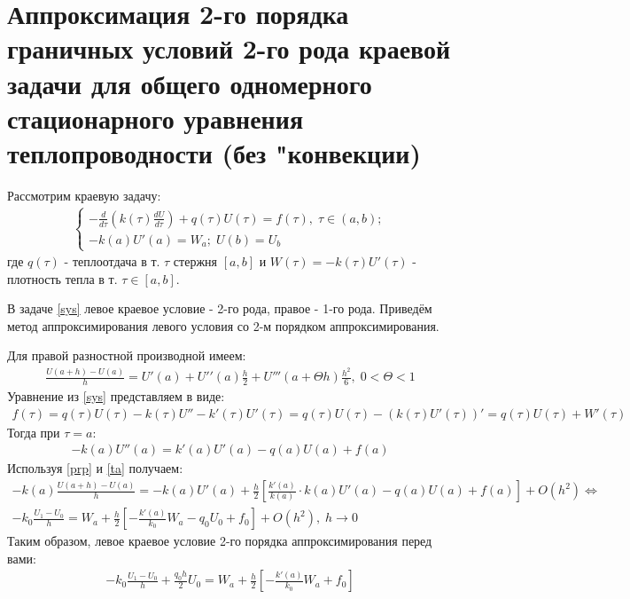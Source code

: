 \documentclass[__main__.tex]{subfiles}
\begin{document}
\section{Аппроксимация 2-го порядка граничных условий 2-го рода краевой задачи для общего одномерного стационарного уравнения теплопроводности (без "конвекции)}

Рассмотрим краевую задачу:
\begin{gather}
	\begin{cases}
	-\frac{d}{d\tau}\left(k(\tau)\frac{dU}{d\tau}\right)+
	q(\tau)U(\tau)=f(\tau),\; \tau\in(a,b);\\
	-k(a)U\prime(a)=W_a;\; U(b)=U_b
	\end{cases}
	\label{sys}
\end{gather}
где $q(\tau)$ - теплоотдача в т. $\tau$ стержня $[a,b]$ и $W(\tau)=-k(\tau)U\prime(\tau)$ - плотность тепла в т. $\tau\in[a,b].$

В задаче \ref{sys} левое краевое условие - 2-го рода, правое - 1-го рода. Приведём метод аппроксимирования левого условия со 2-м порядком аппроксимирования.

Для правой разностной производной имеем:
\begin{gather}
	\frac{U(a+h)-U(a)}{h}=U\prime(a)+U\prime\prime(a)\frac{h}{2}+U'''(a+\Theta h)\frac{h^2}{6},\; 0<\Theta<1
	\label{prp}
\end{gather}
Уравнение из \ref{sys} представляем в виде:
\begin{gather*}
	f(\tau)=q(\tau)U(\tau)-k(\tau)U''-k'(\tau)U'(\tau)=
	q(\tau)U(\tau)-\left(k(\tau)U'(\tau)\right)'=
	q(\tau)U(\tau)+W'(\tau)
\end{gather*}
Тогда при $\tau=a:$
\begin{gather}
	-k(a)U''(a)=k'(a)U'(a)-q(a)U(a)+f(a)
	\label{ta}
\end{gather}
Используя \ref{prp} и \ref{ta} получаем:
\begin{gather*}
	-k(a)\frac{U(a+h)-U(a)}{h}=-k(a)U'(a)+\frac{h}{2}\left[\frac{k'(a)}{k(a)}\cdot k(a)U'(a)-q(a)U(a)+f(a)\right]+O(h^2)\Leftrightarrow\\
	-k_0\frac{U_1-U_0}{h}=W_a+\frac{h}{2}\left[-\frac{k'(a)}{k_0}W_a-q_0U_0+f_0\right]+O(h^2),\;h\rightarrow0
\end{gather*}
Таким образом, левое краевое условие 2-го порядка аппроксимирования перед вами:
\begin{gather*}
	-k_0\frac{U_1-U_0}{h}+\frac{q_0h}{2}U_0=W_a+\frac{h}{2}\left[-\frac{k'(a)}{k_0}W_a+f_0\right]
\end{gather*}
\end{document}
